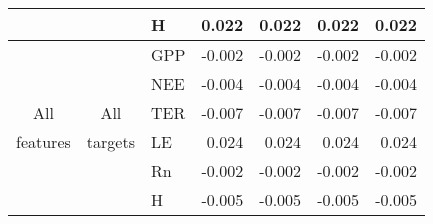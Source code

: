 \begin{table}[htbp]
\begin{center}
\begin{tabular}{|l|l|l|r|r|r|r|}
    \multicolumn{ 1}{|l|}{} & \multicolumn{ 1}{l|}{} &  H & 0.022 & 0.022 & 0.022 & 0.022 \\ \hline

    \multicolumn{ 1}{|c|}{} & \multicolumn{ 1}{c|}{} & GPP& -0.002 & -0.002 & -0.002 & -0.002 \\ \cline{ 3- 6}

    \multicolumn{ 1}{|c|}{} & \multicolumn{ 1}{l|}{} & NEE & -0.004 & -0.004 & -0.004 & -0.004 \\ \cline{ 3- 6}

    \multicolumn{ 1}{|c|}{All} & \multicolumn{ 1}{c|}{All} & TER & -0.007 & -0.007 & -0.007 & -0.007 \\ \cline{ 3- 6}

    \multicolumn{ 1}{|c|}{features} & \multicolumn{ 1}{c|}{targets} & LE & 0.024 & 0.024 & 0.024 & 0.024 \\ \cline{ 3- 6}

    \multicolumn{ 1}{|l|}{} & \multicolumn{ 1}{l|}{} & Rn & -0.002 & -0.002 & -0.002 & -0.002 \\ \cline{ 3- 6}

    \multicolumn{ 1}{|l|}{} & \multicolumn{ 1}{l|}{} & H & -0.005 & -0.005 & -0.005 & -0.005 \\ \hline

\end{tabular}

\end{center}

\label{results}

\end{table}

